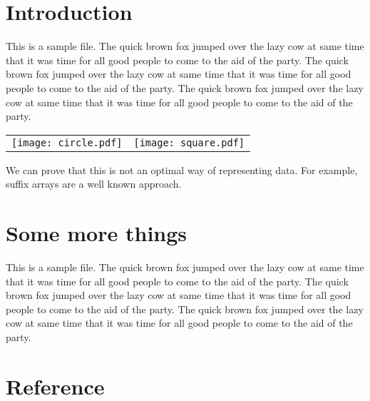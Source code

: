 \documentclass[11pt]{article}
\begin{document}
\section{Introduction}

This is a sample file. The quick brown fox jumped over the lazy cow at
same time that it was time for all good people to come to the aid of
the party. The quick brown fox jumped over the lazy cow at
same time that it was time for all good people to come to the aid of
the party. The quick brown fox jumped over the lazy cow at
same time that it was time for all good people to come to the aid of
the party.

\begin{center}
\begin{tabular}{lr}
\texttt{[image: circle.pdf]}
& \texttt{[image: square.pdf]}
\end{tabular}
\end{center}

\noindent
We can prove that this is not an optimal way of representing data. For
example, suffix arrays \cite{manber93} are a well known approach.

\section{Some more things}

This is a sample file. The quick brown fox jumped over the lazy cow at
same time that it was time for all good people to come to the aid of
the party. The quick brown fox jumped over the lazy cow at
same time that it was time for all good people to come to the aid of
the party. The quick brown fox jumped over the lazy cow at
same time that it was time for all good people to come to the aid of
the party.

\section{Reference}


\end{document}
